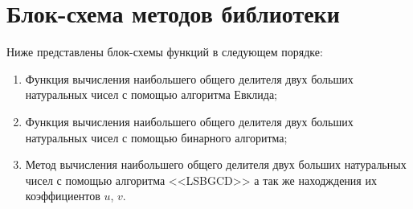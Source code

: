 \section{Блок-схема методов библиотеки}
Ниже представлены блок-схемы функций в следующем порядке:
\begin{enumerate}
    \item Функция вычисления наибольшего общего делителя двух больших натуральных чисел с помощью алгоритма Евклида;
    \item Функция вычисления наибольшего общего делителя двух больших натуральных чисел с помощью бинарного алгоритма;
    \item Метод вычисления наибольшего общего делителя двух больших натуральных чисел с помощью алгоритма <<LSBGCD>>
    а так же находждения их коэффициентов $u$, $v$.
\end{enumerate}

